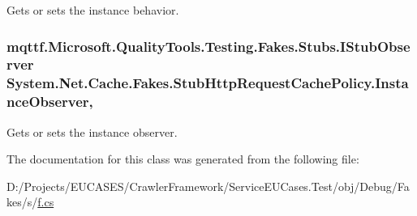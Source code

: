 Gets or sets the instance behavior.

\hypertarget{class_system_1_1_net_1_1_cache_1_1_fakes_1_1_stub_http_request_cache_policy_aab4e6f5f9dfcf7499550f16b0d536e1a}{
\subsubsection[{Instance\-Observer}]{\setlength{\rightskip}{0pt plus 5cm}mqttf.\-Microsoft.\-Quality\-Tools.\-Testing.\-Fakes.\-Stubs.\-I\-Stub\-Observer System.\-Net.\-Cache.\-Fakes.\-Stub\-Http\-Request\-Cache\-Policy.\-Instance\-Observer\hspace{0.3cm}{\ttfamily [get]}, {\ttfamily [set]}}}\label{class_system_1_1_net_1_1_cache_1_1_fakes_1_1_stub_http_request_cache_policy_aab4e6f5f9dfcf7499550f16b0d536e1a}


Gets or sets the instance observer.



The documentation for this class was generated from the following file\-:\begin{DoxyCompactItemize}
\item 
D\-:/\-Projects/\-E\-U\-C\-A\-S\-E\-S/\-Crawler\-Framework/\-Service\-E\-U\-Cases.\-Test/obj/\-Debug/\-Fakes/s/\hyperlink{s_2f_8cs}{f.\-cs}\end{DoxyCompactItemize}
